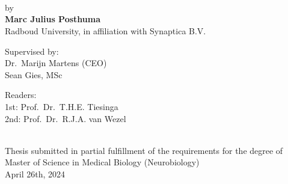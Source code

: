 \documentclass[12pt]{report}
\begin{document}
\begin{titlepage}
    \centering
    \vspace*{1cm}
    \\
    \\
    \\[1cm]
    \Large by\\[1cm]
    \Large \textbf{Marc Julius Posthuma}\\[1cm]
    \Large Radboud University, in affiliation with Synaptica B.V.\\

    \vfill
    \begin{minipage}{0.5\textwidth}
        \centering
        \Large Supervised by:\\
        Dr.\ Marijn Martens (CEO)\\
        Sean Gies, MSc
    \end{minipage}%
    \begin{minipage}{0.5\textwidth}
        \centering
        \Large Readers:\\
        1st: Prof.\ Dr.\ T.H.E. Tiesinga\\
        2nd: Prof.\ Dr.\ R.J.A. van Wezel
    \end{minipage}\\[2cm]

    \footnotesize Thesis submitted in partial fulfillment of the requirements for the degree of Master of Science in Medical Biology (Neurobiology)\\[1cm]
    \Large April 26th, 2024
\end{titlepage}

\listoftodos%

%



\tableofcontents
\listoffigures
\listoftables




\printbibliography%
\appendix



\end{document}
